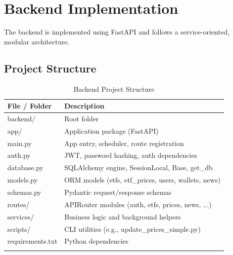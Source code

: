 \section{Backend Implementation}

The backend is implemented using FastAPI and follows a service-oriented, modular architecture.

\subsection{Project Structure}

\begin{table}[H]
\centering
\begin{tabular}{p{4cm} p{10cm}}
\toprule
\textbf{File / Folder} & \textbf{Description} \\
\midrule
backend/ & Root folder \\
\hspace{0.5cm}app/ & Application package (FastAPI) \\
\hspace{1cm}main.py & App entry, scheduler, route registration \\
\hspace{1cm}auth.py & JWT, password hashing, auth dependencies \\
\hspace{1cm}database.py & SQLAlchemy engine, SessionLocal, Base, get\_db \\
\hspace{1cm}models.py & ORM models (etfs, etf\_prices, users, wallets, news) \\
\hspace{1cm}schemas.py & Pydantic request/response schemas \\
\hspace{1cm}routes/ & APIRouter modules (auth, etfs, prices, news, ...) \\
\hspace{1cm}services/ & Business logic and background helpers \\
\hspace{0.5cm}scripts/ & CLI utilities (e.g., update\_prices\_simple.py) \\
requirements.txt & Python dependencies \\
\bottomrule
\centering
\end{tabular}
\caption{Backend Project Structure}
\end{table}

